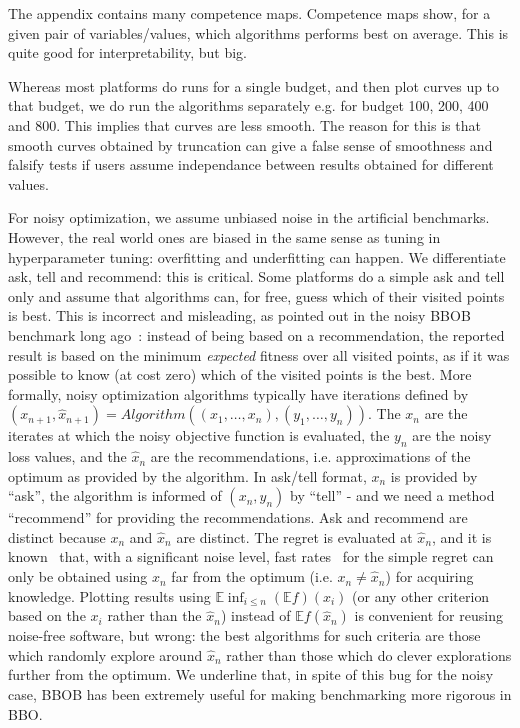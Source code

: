 \documentclass{article}
\def\E{\mathbb{E}}
\begin{document}
The appendix contains many competence maps. Competence maps show, for a given pair of variables/values, which algorithms performs best on average. This is quite good for interpretability, but big.

Whereas most platforms do runs for a single budget, and then plot curves up to that budget, we do run the algorithms separately e.g. for budget 100, 200, 400 and 800. This implies that curves are less smooth. The reason for this is that smooth curves obtained by truncation can give a false sense of smoothness and falsify tests if users assume independance between results obtained for different values.

For noisy optimization, we assume unbiased noise in the artificial benchmarks. However, the real world ones are biased in the same sense as tuning in hyperparameter tuning: overfitting and underfitting can happen.
We differentiate ask, tell and recommend: this is critical. Some platforms do a simple ask and tell only and assume that
algorithms can, for free, guess which of their visited points is best. This is incorrect and misleading, as pointed out
in the noisy BBOB benchmark long ago~\cite{bbobissue1,bbobissue2,bbobissue3,bbobissue4}: instead of being based on a recommendation, the reported result is based on the minimum { {\em{expected}} fitness} over all visited points, as if it was possible to know (at cost zero) which of the visited points is the best.
More formally, noisy optimization algorithms typically have iterations defined by $(x_{n+1},\hat
x_{n+1})=Algorithm((x_1,\dots,x_n),(y_1,\dots,y_n))$. The $x_n$ are the iterates at which the noisy objective function
is evaluated, the $y_n$ are the noisy loss values, and the $\hat x_n$ are the recommendations, i.e. approximations of
the optimum as provided by the algorithm. In ask/tell format, $x_n$ is provided by ``ask'', the algorithm is informed of
$(x_n,y_n)$ by ``tell'' - and we need a method ``recommend'' for providing the recommendations. Ask and recommend are
distinct because $x_n$ and $\hat x_n$ are distinct. The regret is evaluated at $\hat x_n$, and it is
known~\cite{fabian,decocknoise} that, with a significant noise level, fast rates~\cite{fabian,chen1988} for the simple regret can only be obtained using $x_n$ far from the optimum (i.e. $x_n\neq \hat x_n$) for acquiring knowledge. Plotting results using $\E\inf_{i\leq n}(\E f)(x_i)$ (or any other criterion based on the $x_i$ rather than the $\hat x_n$) instead of $\E f(\hat x_n)$ is convenient for reusing noise-free software, but wrong: the best algorithms for such criteria are those which randomly explore around $\hat x_n$ rather than those which do clever explorations further from the optimum. We underline that, in spite of this bug for the noisy case, BBOB has been extremely useful for making benchmarking more rigorous in BBO.
\end{document}
